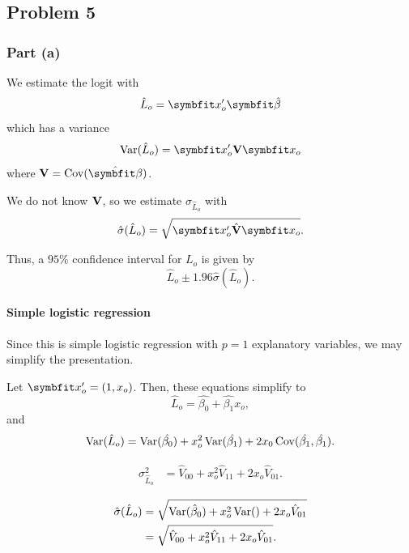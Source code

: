 \documentclass[
  11pt,
]{article}
\begin{document}
\hypertarget{problem-5}{%
\subsection{Problem 5}\label{problem-5}}

\hypertarget{part-a-3}{%
\subsubsection{Part (a)}\label{part-a-3}}


We estimate the logit with \[
  \hat{L}_o = \v{x}_o' \v{\hat{\beta}}
\] which has a variance \[
  \var(\hat{L}_o) = \v{x}_o' \mat{V} \v{x}_o
\] where \(\mat{V} = \mat{\cov}(\hat{\v{\beta}})\).

We do not know \(\mathbf{V}\), so we estimate \(\sigma_{\hat{L}_o}\) with
\[
  \hat{\sigma}(\hat{L}_o) = \sqrt{\v{x}_o' \hat{\mat{V}} \v{x}_o}.
\]

Thus, a \(95\%\) confidence interval for \(L_o\) is given by \[
  \hat{L}_o \pm 1.96 \hat{\sigma}(\hat{L}_o).
\]

\hypertarget{simple-logistic-regression-1}{%
\paragraph{Simple logistic
regression}\label{simple-logistic-regression-1}}

Since this is simple logistic regression with \(p=1\) explanatory
variables, we may simplify the presentation.

Let \(\v{x}_o' = (1,x_o)\). Then, these equations simplify to \[
  \hat{L}_o = \hat{\beta_0} + \hat{\beta_1} x_o,
\] and \[
  \operatorname{Var}(\hat{L}_o) = \operatorname{Var}(\hat{\beta_0}) +
    x_o^2 \operatorname{Var}(\hat{\beta_1}) + 2x_0 \operatorname{Cov}(\hat{\beta_1},\hat{\beta_1}).
\]

\begin{align*}
  \sigma_{\hat{L}_o}^2
    &= \hat{V}_{0 0} + x_o^2 \hat{V}_{1 1} + 2x_o \hat{V}_{0 1}.
\end{align*}

\begin{align*}
  \hat{\sigma}(\hat{L}_o)
    &= \sqrt{\operatorname{Var}(\hat\beta_0) + x_o^2 \operatorname{Var}() + 2x_o \hat{V}_{0 1}}\\
    &= \sqrt{\hat{V}_{0 0} + x_o^2 \hat{V}_{1 1} + 2x_o \hat{V}_{0 1}}.
\end{align*}
\end{document}
